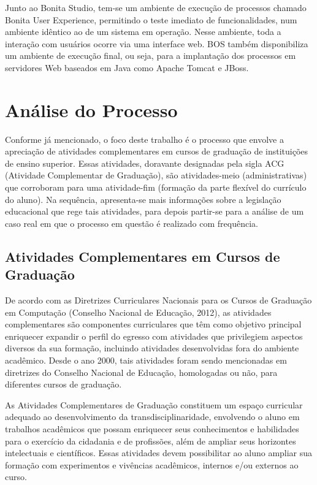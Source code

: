 \documentclass[12pt]{article}
\begin{document}
Junto ao Bonita Studio, tem-se um ambiente de execução de processos chamado Bonita User Experience, permitindo o teste imediato de funcionalidades, num ambiente idêntico ao de um sistema em operação. Nesse ambiente, toda a interação com usuários ocorre via uma interface web. BOS também disponibiliza um ambiente de execução final, ou seja, para a implantação dos processos em servidores Web baseados em Java como Apache Tomcat e JBoss.

\section{Análise do Processo}

Conforme já mencionado, o foco deste trabalho é o processo que envolve a apreciação de atividades complementares em cursos de graduação de instituições de ensino superior. Essas atividades, doravante designadas pela sigla ACG (Atividade Complementar de Graduação), são atividades-meio (administrativas) que corroboram para uma atividade-fim (formação da parte flexível do currículo do aluno). Na sequência, apresenta-se mais informações sobre a legislação educacional que rege tais atividades, para depois partir-se para a análise de um caso real em que o processo em questão é realizado com frequência.

\subsection{Atividades Complementares em Cursos de Graduação}

De acordo com as Diretrizes Curriculares Nacionais para os Cursos de Graduação em Computação (Conselho Nacional de Educação, 2012), as atividades complementares são componentes curriculares que têm como objetivo principal enriquecer expandir o perfil do egresso com atividades que privilegiem aspectos diversos da sua formação, incluindo atividades desenvolvidas fora do ambiente acadêmico. Desde o ano 2000, tais atividades foram sendo mencionadas em diretrizes do Conselho Nacional de Educação, homologadas ou não, para diferentes cursos de graduação.

	As Atividades Complementares de Graduação constituem um espaço curricular adequado ao desenvolvimento da transdisciplinaridade, envolvendo o aluno em trabalhos acadêmicos que possam enriquecer seus conhecimentos e habilidades para o exercício da cidadania e de profissões, além de ampliar seus horizontes intelectuais e científicos. Essas atividades devem possibilitar ao aluno ampliar sua formação com experimentos e vivências acadêmicos, internos e/ou externos ao curso.
\end{document}
